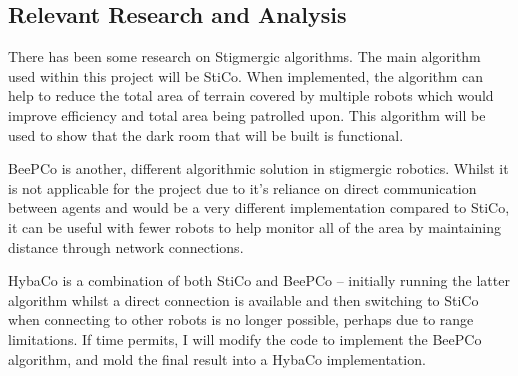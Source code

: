 \subsection{Relevant Research and Analysis} \label{desResAnal}
There has been some research on Stigmergic algorithms.  The main algorithm used
within this project will be 
StiCo\cite{Ranjbar-Sahraei2012,Ranjbar-Sahraei2012Demo,Ranjbar-Sahraei2013}.
When implemented, the algorithm can help to reduce the total area of terrain
covered by multiple robots which would improve efficiency and total area 
being patrolled upon.  This algorithm will be used to show that the dark room
that will be built is functional.

BeePCo is another, different algorithmic solution in stigmergic robotics.  
Whilst it is not applicable for the project due to it's reliance on direct
communication between agents and would be a very different implementation 
compared to StiCo, it can be useful with fewer robots to help monitor all of the
area by maintaining distance through network connections.

HybaCo is a combination of both StiCo and BeePCo -- initially running the latter
algorithm whilst a direct connection is available and then switching to StiCo
when connecting to other robots is no longer possible, perhaps due to range
limitations\cite{Broecker2015}.  If time permits, I will modify the code
to implement the BeePCo algorithm, and mold the final result into a HybaCo
implementation.


